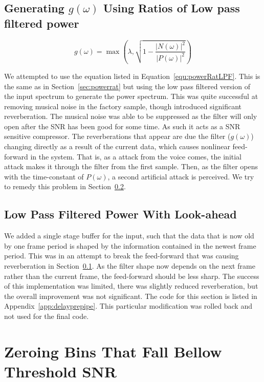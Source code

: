 \documentclass[11pt]{article} %
\begin{document}
{\subsection{Generating $g(\omega)$ Using Ratios of Low pass filtered power} 
\label{sec:powerratLPF}
\begin{equation}
\label{equ:powerRatLPF}
	g(\omega) = \max\left(\lambda, \sqrt{1- \frac{\lvert N(\omega) \rvert ^{2}}{\lvert P(\omega) \rvert ^{2}}}\right)
\end{equation}

We attempted to use the equation listed in Equation~\ref{equ:powerRatLPF}. This is the same as in Section~\ref{sec:powerrat} but using the low pass filtered version of the input spectrum to generate the power spectrum. This was quite successful at removing musical noise in the factory sample, though introduced significant reverberation. The musical noise was able to be suppressed as the filter will only open after the SNR has been good for some time. As such it acts as a SNR sensitive compressor.
The reverberations that appear are due the filter ($g(\omega)$) changing directly as a result of the current data, which causes nonlinear feed-forward in the system. That is, as a attack from the voice comes, the initial attack makes it through the filter from the first sample. Then, as the filter opens with the time-constant of $P(\omega)$, a second artificial attack is perceived. We try to remedy this problem in Section~\ref{sec:delayprepipe}.

\subsection{Low Pass Filtered Power With Look-ahead}
\label{sec:delayprepipe}

We added a single stage buffer for the input, such that the data that is now old by one frame period is shaped by the information contained in the newest frame period. This was in an attempt to break the feed-forward that was causing reverberation in Section~\ref{sec:powerratLPF}.
As the filter shape now depends on the next frame rather than the current frame, the feed-forward should be less sharp. The success of this implementation was limited, there was slightly reduced reverberation, but the overall improvement was not significant. The code for this section is listed in Appendix~\ref{app:delayprepipe}. This particular modification was rolled back and not used for the final code.

\section{Zeroing Bins That Fall Bellow Threshold SNR} 

}
\end{document}
